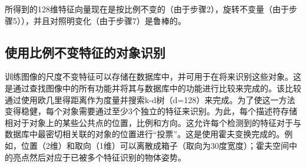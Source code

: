 
所得到的128维特征向量现在是按比例不变的（由于步骤2），旋转不变量（由于步骤5）），并且对照明变化（由于步骤7）是鲁棒的。


\subsection{使用比例不变特征的对象识别}
训练图像的尺度不变特征可以存储在数据库中，并可用于在将来识别这些对象。这是通过查找图像中的所有功能并将其与数据库中的功能进行比较来完成的。该比较通过使用欧几里得距离作为度量并搜索k-d树（d=128）来完成。为了使这一方法变得稳健，每个对象需要通过至少3个独立的特征来识别。为此，每个描述符存储相对于对象上的某些公共点的位置，比例和方向。这允许每个检测到的特征对于与数据库中最密切相关联的对象的位置进行“投票”。这是使用霍夫变换完成的。例如，位置（2维）和取向（1维）可以离散成箱子（取向为30度宽度）；霍夫空间中的亮点然后对应于已被多个特征识别的物体姿势。

